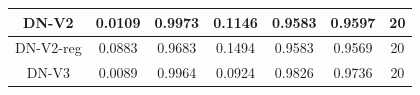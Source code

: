 \documentclass[11pt,a4paper]{article}
\theoremstyle{definition}
\begin{document}
\begin{table}[H]
\begin{tabular}{|c|c|c|c|c|c|c|}
\hline
DN-V2                                               & \textcolor[rgb]{0.129,0.129,0.129}{0.0109 } & \textcolor[rgb]{0.129,0.129,0.129}{0.9973 } & \textcolor[rgb]{0.129,0.129,0.129}{0.1146 }                                                                       & \textcolor[rgb]{0.129,0.129,0.129}{0.9583}                                                                             & \textcolor[rgb]{0.129,0.129,0.129}{0.9597}                                                                       & 20                                                                                                              \\
\hline
DN-V2-reg                                           & \textcolor[rgb]{0.129,0.129,0.129}{0.0883 } & \textcolor[rgb]{0.129,0.129,0.129}{0.9683 } & \textcolor[rgb]{0.129,0.129,0.129}{0.1494 }                                                                       & \textcolor[rgb]{0.129,0.129,0.129}{0.9583}                                                                             & \textcolor[rgb]{0.129,0.129,0.129}{0.9569}                                                                       & 20                                                                                                              \\
\hline
\rowcolor{green} DN-V3                                               & \textcolor[rgb]{0.129,0.129,0.129}{0.0089 } & \textcolor[rgb]{0.129,0.129,0.129}{0.9964 } & \textcolor[rgb]{0.129,0.129,0.129}{0.0924 }                                                                       & \textcolor[rgb]{0.129,0.129,0.129}{0.9826}                                                                             & \textcolor[rgb]{0.129,0.129,0.129}{0.9736}                                                                       & 20                                                                                                              \\
\hline


\end{tabular}
\end{table}
\end{document}
